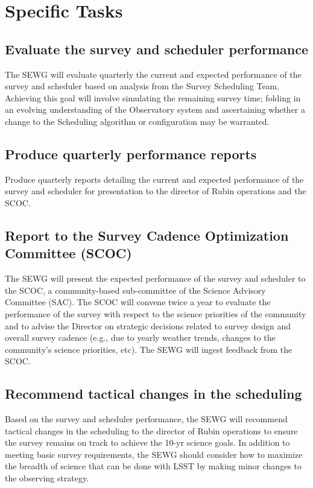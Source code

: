\documentclass[DM,authoryear,toc]{lsstdoc}
\begin{document}
 
\section{Specific Tasks}

\subsection{Evaluate the survey and scheduler performance}
The SEWG will evaluate quarterly the current and expected performance of the survey and scheduler based on analysis from the Survey Scheduling Team.
Achieving this goal will involve simulating the remaining survey time; folding in an evolving understanding of the Observatory system and ascertaining whether a change to the Scheduling algorithm or configuration may be warranted. 

\subsection{Produce quarterly performance reports}
Produce quarterly reports detailing the current and expected performance of the survey and scheduler for presentation to the director of Rubin operations and the SCOC. 

\subsection{Report to the Survey Cadence Optimization Committee (SCOC)}
The SEWG will present the expected performance of the survey and scheduler to the SCOC,  a community-based sub-committee of the Science Advisory Committee (SAC). 
The SCOC will convene twice a year to evaluate the performance of the survey with respect to the science priorities of the community and to advise the Director on strategic decisions related to survey design and overall survey cadence (e.g., due to  yearly weather trends, changes to the community's science priorities, etc).
The SEWG will ingest feedback from the SCOC.


\subsection{Recommend tactical changes in the scheduling}
Based on the  survey and scheduler performance, the SEWG will recommend tactical changes in the scheduling to the director of Rubin operations to ensure the survey remains on track to achieve the 10-yr science goals.
In addition to meeting basic survey requirements, the SEWG should consider how to maximize the breadth of science that can be done with LSST by making minor changes to the observing strategy. 
\end{document}
